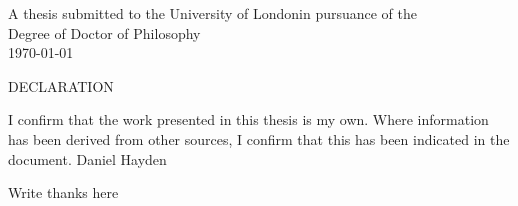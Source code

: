 \documentclass[11pt,a4paper]{report} %
\renewcommand{\chaptermark}[1]{\markboth{#1}{}}
\renewcommand{\sectionmark}[1]{\markright{\thesection\ #1}{}}
\renewcommand{\plainfootrulewidth}{0pt}%
\renewcommand{\baselinestretch}{1.5}
\begin{document}
\begin{titlepage}
\begin{center}
	\vspace{2cm}
				 {A thesis submitted to the University of Londonin pursuance of the \\Degree of Doctor of Philosophy\\}
				 \vspace{1cm}
{\today\\}
\end{center}
\end{titlepage}

\newpage
\begin{center}
\vspace*{6cm}
{\LARGE DECLARATION} \newline
\vspace*{1cm}
\end{center}
\vspace{1cm}
I confirm that the work presented in this thesis is my own.  Where information has been derived from other sources, I confirm that this has been indicated in the document.\newline \newline \newline 
\vspace{5cm}
Daniel Hayden 


\begin{abstract}

\end{abstract}

\thispagestyle{empty} %
\begin{center}
Write thanks here



\end{center}
\vspace{1cm}

\tableofcontents
\listoffigures
\listoftables

\newpage

\pagestyle{fancy}
\addtolength{\headwidth}{\marginparsep}
\renewcommand{\chaptermark}[1]{\markboth{#1}{}}
\renewcommand{\sectionmark}[1]{\markright{\thesection\ #1}{}}
\fancyfoot[RO,RE]{\thepage}
\fancyhead[RO]{\leftmark}
\fancyhead[LO]{\rightmark}
\cfoot{}

\fancypagestyle{plain}{\renewcommand{\headrulewidth}{0pt}%
       \renewcommand{\plainfootrulewidth}{0pt}%
        \fancyhead[RO,LO]{}}
\renewcommand{\baselinestretch}{1.5} 

\newpage



\newpage


\end{document}
